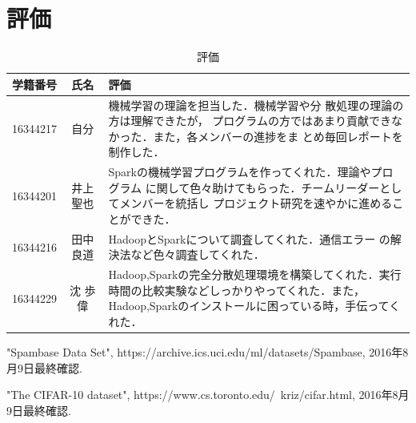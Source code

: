 \documentclass[a4paper,12pt]{jarticle}
\begin{document}
\section{評価}
\begin{table}[hbtp]
\centering
\caption{評価}
\label{tab:評価}
\fontsize{9pt}{10pt}\selectfont
\begin{tabular}{c|c||p{100mm}} \hline
 学籍番号&氏名     &評価   \\ \hline \hline
 16344217&自分& 機械学習の理論を担当した．機械学習や分
		 散処理の理論の方は理解できたが，
		 プログラムの方ではあまり貢献できなかった．また，各メンバーの進捗をま
		 とめ毎回レポートを制作した．\\ \hline
16344201&井上 聖也&Sparkの機械学習プログラムを作ってくれた．理論やプログラム
		 に関して色々助けてもらった．チームリーダーとしてメンバーを統括し
		 プロジェクト研究を速やかに進めることができた．\\ \hline
16344216&田中 良道& HadoopとSparkについて調査してくれた．通信エラー
		 の解決法など色々調査してくれた．\\ \hline 
16344229&沈 歩偉　& Hadoop,Sparkの完全分散処理環境を構築してくれた．実行
		 時間の比較実験などしっかりやってくれた．また，
		 Hadoop,Sparkのインストールに困っている時，手伝ってくれた． \\ \hline
\end{tabular}
\end{table}
\begin{thebibliography}{99}

  "Spambase Data Set",
		 https://archive.ics.uci.edu/ml/datasets/Spambase, 2016年8月9日最終確認.

  "The CIFAR-10 dataset",
		 https://www.cs.toronto.edu/~kriz/cifar.html, 2016年8月9日最終確認.

\end{thebibliography}
\end{document}
